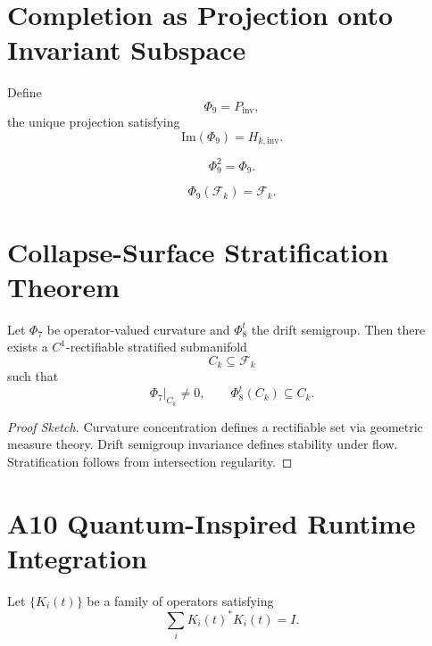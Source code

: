 \section{Completion as Projection onto Invariant Subspace}

\begin{definition}
Define
\[
\Phi_9 = P_{\mathrm{inv}},
\]
the unique projection satisfying
\[
\mathrm{Im}(\Phi_9) = H_{k,\mathrm{inv}}.
\]
\end{definition}

\begin{lemma}[Idempotence]
\[
\Phi_9^2 = \Phi_9.
\]
\end{lemma}

\begin{lemma}
\[
\Phi_9(\mathcal{F}_k) = \mathcal{F}_k.
\]
\end{lemma}

\section{Collapse-Surface Stratification Theorem}

\begin{theorem}
Let $\Phi_7$ be operator-valued curvature and $\Phi_8^t$ the drift semigroup.
Then there exists a $C^1$-rectifiable stratified submanifold
\[
C_k \subseteq \mathcal{F}_k
\]
such that
\[
\Phi_7|_{C_k} \neq 0,
\qquad
\Phi_8^t(C_k) \subseteq C_k.
\]
\end{theorem}

\begin{proof}[Proof Sketch]
Curvature concentration defines a rectifiable set via geometric measure theory.
Drift semigroup invariance defines stability under flow. Stratification follows
from intersection regularity.
\end{proof}

\section{A10 Quantum-Inspired Runtime Integration}

\begin{definition}
Let $\{K_i(t)\}$ be a family of operators satisfying
\[
\sum_i K_i(t)^\ast K_i(t) = I.
\]
\end{definition}

